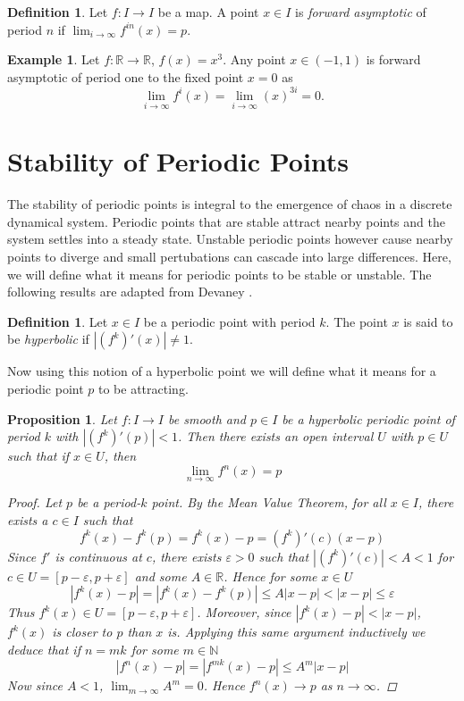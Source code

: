 \documentclass[11pt,a4paper,oneside]{memoir}
\theoremstyle{plain}
\newtheorem{prop}[thm]{Proposition}
\theoremstyle{definition}
\newtheorem{defn}[thm]{Definition}
\newtheorem{exmp}[thm]{Example}
\begin{document}
\begin{defn}
    Let $f: I \to I$ be a map. A point $x \in I$ is \emph{forward asymptotic} of period $n$ if $\lim_{i \to \infty} f^{in}(x) = p$.
\end{defn}

\begin{exmp}
    Let $f: \mathbb{R} \to \mathbb{R}$, $f(x) = x^3$. Any point $x \in (-1, 1)$ is forward asymptotic of period one to the fixed point $x = 0$ as \[\lim_{i \to \infty} f^{i} \left(x\right)  = \lim_{i \to \infty} \left(x\right) ^{3i} = 0.\]
\end{exmp}

\section{Stability of Periodic Points}
The stability of periodic points is integral to the emergence of chaos in a discrete dynamical system. Periodic points that are stable attract nearby points and the system settles into a steady state. Unstable periodic points however cause nearby points to diverge and small pertubations can cascade into large differences. Here, we will define what it means for periodic points to be stable or unstable. The following results are adapted from Devaney \cite[Section 1.4]{devaney}.

\begin{defn}
    Let $x \in I$ be a periodic point with period $k$. The point $x$ is said to be \emph{hyperbolic} if $|(f^k)'(x)| \neq 1$.
\end{defn}

Now using this notion of a hyperbolic point we will define what it means for a periodic point $p$ to be attracting.

\begin{prop} \label{prop:attractor}
    Let $f: I \to I$ be smooth and $p \in I$ be a hyperbolic periodic point of period $k$ with $|(f^k)'(p)| < 1$. Then there exists an open interval $U$ with $p \in U$ such that if $x \in U$, then \[ \lim_{n \to \infty} f^n(x) = p \]

    \begin{proof}
        Let $p$ be a period-$k$ point. By the Mean Value Theorem, for all $x \in I$, there exists a $c \in I$ such that \[f^k(x) - f^k(p) = f^k(x) - p = (f^k)'(c)(x-p)\] Since $f'$ is continuous at $c$, there exists $\varepsilon > 0$ such that $|(f^k)'(c)| < A < 1$ for $c \in U = [p - \varepsilon, p + \varepsilon]$ and some $A \in \mathbb{R}$. Hence for some $x \in U$ \[|f^k(x) - p| = |f^k(x) - f^k(p)| \leq A|x-p| < |x-p| \leq \varepsilon\] Thus $f^k(x) \in U = [p - \varepsilon, p + \varepsilon]$. Moreover, since $|f^k(x) - p| < |x - p|$, $f^k(x)$ is closer to $p$ than $x$ is. Applying this same argument inductively we deduce that if $n = mk$ for some $m \in \mathbb{N}$ \[|f^n(x) - p| = |f^{mk}(x) - p| \leq A^m|x - p|\] Now since $A < 1$, $\lim_{m \to \infty}A^m = 0$. Hence $f^n(x) \to p$ as $n \to \infty$. 
    \end{proof}
\end{prop}
\end{document}
